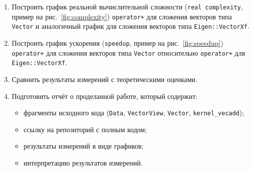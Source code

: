 \documentclass[12pt]{article}
\begin{document}
\begin{enumerate}
    \item Построить график реальной вычислительной сложности (\texttt{real complexity}, пример на рис.~\ref{fig:complexity}) \texttt{operator+} для сложения векторов типа \texttt{Vector} и аналогичный график для сложения векторов типа \texttt{Eigen::VectorXf}.

    \item Построить график ускорения (\texttt{speedup}, пример на рис.~\ref{fig:speedup}) \texttt{operator+} для сложения векторов типа \texttt{Vector} относительно \texttt{operator+} для \texttt{Eigen::VectorXf}.

    \item Сравнить результаты измерений с теоретическими оценками.
    \item Подготовить отчёт о проделанной работе, который содержит:
    \begin{itemize}
        \item фрагменты исходного кода (\texttt{Data}, \texttt{VectorView}, \texttt{Vector}, \texttt{kernel\_vecadd});
        \item ссылку на репозиторий с полным кодом;
        \item результаты измерений в виде графиков;
        \item интерпретацию результатов измерений.
    \end{itemize}
\end{enumerate}
\end{document}
